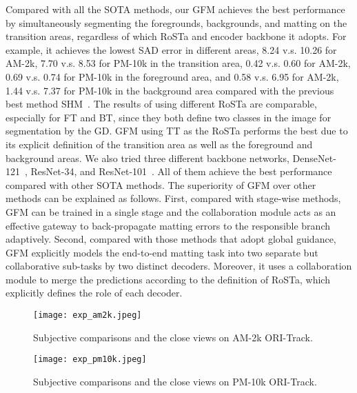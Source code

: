 \documentclass[twocolumn]{svjour3}
\begin{document}
Compared with all the SOTA methods, our GFM achieves the best performance by simultaneously segmenting the foregrounds, backgrounds, and matting on the transition areas, regardless of which RoSTa and encoder backbone it adopts. For example, it achieves the lowest SAD error in different areas,  8.24 v.s. 10.26 for AM-2k, 7.70 v.s. 8.53 for PM-10k in the transition area, 0.42 v.s. 0.60 for AM-2k, 0.69 v.s. 0.74 for PM-10k in the foreground area, and 0.58 v.s. 6.95 for AM-2k, 1.44 v.s. 7.37 for PM-10k in the background area compared with the previous best method SHM~\citep{chen2018semantic}. The results of using different RoSTa are comparable, especially for FT and BT, since they both define two classes in the image for segmentation by the GD. GFM using TT as the RoSTa performs the best due to its explicit definition of the transition area as well as the foreground and background areas. We also tried three different backbone networks, DenseNet-121~\citep{huang2017densely}, ResNet-34, and ResNet-101~\citep{he2016deep}. All of them achieve the best performance compared with other SOTA methods. The superiority of GFM over other methods can be explained as follows. First, compared with stage-wise methods, GFM can be trained in a single stage and the collaboration module acts as an effective gateway to back-propagate matting errors to the responsible branch adaptively. Second, compared with those methods that adopt global guidance, GFM explicitly models the end-to-end matting task into two separate but collaborative sub-tasks by two distinct decoders. Moreover, it uses a collaboration module to merge the predictions according to the definition of RoSTa, which explicitly defines the role of each decoder. 


\begin{figure*}[!t]
\centering
\texttt{[image: exp\_am2k.jpeg]}
    \caption{Subjective comparisons and the close views on AM-2k ORI-Track.}
    \label{fig:am2k_visual}
\end{figure*}
\begin{figure*}[!t]
\centering
\texttt{[image: exp\_pm10k.jpeg]}
    \caption{Subjective comparisons and the close views on PM-10k ORI-Track.}
    \label{fig:pm10k_visual}
\end{figure*}
\end{document}
